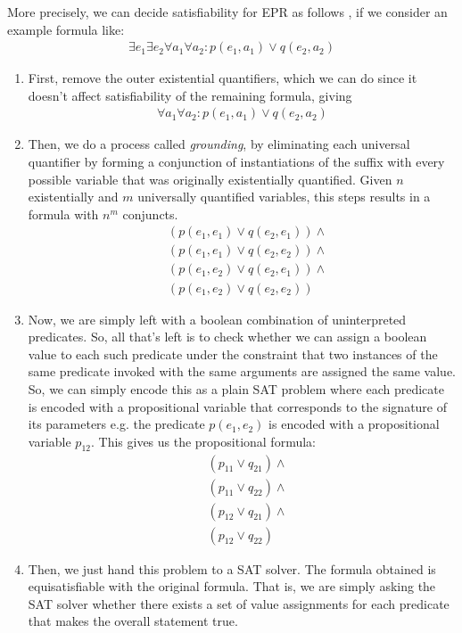 \documentclass[10pt]{article}
\begin{document}
More precisely, we can decide satisfiability for EPR as follows \cite{Kroening2016}, if we consider an example formula like:
\begin{align*}
    \exists e_1 \exists e_2 \forall a_1 \forall a_2 : p(e_1,a_1) \vee q(e_2,a_2)
\end{align*}
\begin{enumerate}
    \item First, remove the outer existential quantifiers, which we can do since it doesn't affect satisfiability of the remaining formula, giving
    \begin{align*}
        \forall a_1 \forall a_2 : p(e_1,a_1) \vee q(e_2,a_2)
    \end{align*}
    \item Then, we do a process called \textit{grounding}, by eliminating each universal quantifier by forming a conjunction of instantiations of the suffix with every possible variable that was originally existentially quantified. Given $n$ existentially and $m$ universally quantified variables, this steps results in a formula with $n^m$ conjuncts.
    \begin{align*}
        &(p(e_1,e_1) \vee q(e_2,e_1)) \wedge \\
        &(p(e_1,e_1) \vee q(e_2,e_2)) \wedge \\
        &(p(e_1,e_2) \vee q(e_2,e_1)) \wedge \\
        &(p(e_1,e_2) \vee q(e_2,e_2))
    \end{align*}
    \item Now, we are simply left with a boolean combination of uninterpreted predicates. So, all that's left is to check whether we can assign a boolean value to each such predicate under the constraint that two instances of the same predicate invoked with the same arguments are assigned the same value. So, we can simply encode this as a plain SAT problem where each predicate is encoded with a propositional variable that corresponds to the signature of its parameters e.g. the predicate $p(e_1,e_2)$ is encoded with a propositional variable $p_{12}$. This gives us the propositional formula:
    \begin{align*}
        &(p_{11} \vee q_{21}) \wedge \\
        &(p_{11} \vee q_{22}) \wedge \\
        &(p_{12} \vee q_{21}) \wedge \\
        &(p_{12} \vee q_{22})  
    \end{align*}
    \item Then, we just hand this problem to a SAT solver. The formula obtained is equisatisfiable with the original formula. That is, we are simply asking the SAT solver whether there exists a set of value assignments for each predicate that makes the overall statement true.
\end{enumerate}
\end{document}

